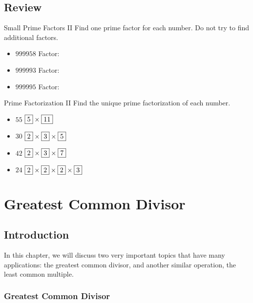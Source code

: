 \documentclass[a4paper,10pt]{report}
\begin{document}
\section{Review}

\begin{problem}{Small Prime Factors II}
 Find one prime factor for each number. Do not try to find additional factors.

 \begin{itemize}
  \item $999958$ \hfill Factor: 
  \item $999993$ \hfill Factor: 
  \item $999995$ \hfill Factor: 
 \end{itemize}

\end{problem}

\begin{problem}{Prime Factorization II}
 Find the unique prime factorization of each number.

 \begin{itemize}
  \item $55$ \hfill $\Ans{5} \times \Ans{11}$
  \item $30$ \hfill $\Ans{2} \times \Ans{3} \times \Ans{5}$
  \item $42$ \hfill $\Ans{2} \times \Ans{3} \times \Ans{7}$
  \item $24$ \hfill $\Ans{2} \times \Ans{2} \times \Ans{2} \times \Ans{3}$
 \end{itemize}
\end{problem}


\chapter{Greatest Common Divisor}

\section{Introduction}

In this chapter, we will discuss two very important
topics that have many applications: the greatest common divisor, and another
similar operation, the least common multiple.

\subsection{Greatest Common Divisor}
\end{document}

